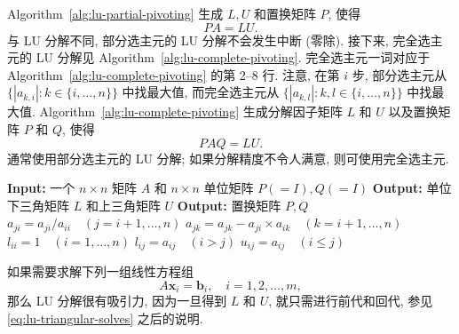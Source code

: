 {Algorithm~\ref{alg:lu-partial-pivoting} 生成 $L,U$ 和置换矩阵 $P$, 使得}
\[PA=LU.\]
{与 LU 分解不同, 部分选主元的 LU 分解不会发生中断 (零除).}
{接下来, 完全选主元的 LU 分解见 Algorithm~\ref{alg:lu-complete-pivoting}. 完全选主元一词对应于 Algorithm~\ref{alg:lu-complete-pivoting} 的第 2--8 行.}
{注意, 在第 $i$ 步, 部分选主元从 $\{|a_{k,i}|:k\in\{i,\ldots,n\}\}$ 中找最大值, 而完全选主元从 $\{|a_{k,l}|:k,l\in\{i,\ldots,n\}\}$ 中找最大值.}
{Algorithm~\ref{alg:lu-complete-pivoting} 生成分解因子矩阵 $L$ 和 $U$ 以及置换矩阵 $P$ 和 $Q$, 使得}
\[PAQ=LU.\]
{通常使用部分选主元的 LU 分解; 如果分解精度不令人满意, 则可使用完全选主元.}
\begin{algorithm}[H]
\caption{{完全选主元的 LU 分解}}\label{alg:lu-complete-pivoting}
\begin{algorithmic}[1]
\Statex \textbf{Input:} {一个 $n\times n$ 矩阵 $A$ 和 $n\times n$ 单位矩阵 $P(=I),Q(=I)$}
\Statex \textbf{Output:} {单位下三角矩阵 $L$ 和上三角矩阵 $U$}
\Statex \textbf{Output:} {置换矩阵 $P,Q$}
\EndIf
\State $a_{ji}=a_{ji}/a_{ii}\quad(j=i+1,\ldots,n)$
\State $a_{jk}=a_{jk}-a_{ji}\times a_{ik}\quad(k=i+1,\ldots,n)$
\EndFor
\EndFor
\State $l_{ii}=1\quad(i=1,\ldots,n)$
\State $l_{ij}=a_{ij}\quad(i>j)$
\State $u_{ij}=a_{ij}\quad(i\le j)$
\end{algorithmic}
\end{algorithm}
{如果需要求解下列一组线性方程组}
\[A\bm x_i=\bm b_i,\quad i=1,2,\ldots,m,\]
{那么 LU 分解很有吸引力, 因为一旦得到 $L$ 和 $U$, 就只需进行前代和回代, 参见 \eqref{eq:lu-triangular-solves} 之后的说明.}
